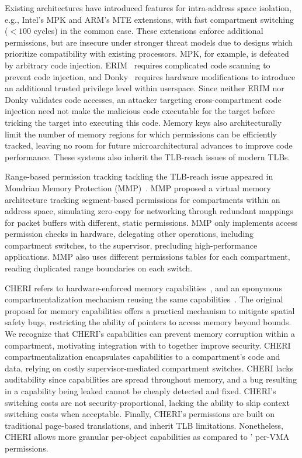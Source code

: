 Existing architectures have introduced features for intra-address
space isolation, e.g., Intel's MPK and ARM's MTE extensions,
with fast compartment switching ($<100$ cycles) in the common case.
These extensions enforce additional permissions, but
are insecure under stronger threat models due to designs which
prioritize compatibility with existing processors.
MPK, for example, is defeated by arbitrary code injection.
ERIM~\cite{ERIMOberwagner19} requires complicated code scanning to
prevent code injection, and Donky~\cite{SchrammelWSS0MG20Donky} requires 
hardware modifications to introduce an additional trusted privilege level 
within userspace.
Since neither ERIM nor Donky validates code accesses, an attacker
targeting cross-compartment code injection need not make the
malicious code executable for the target before tricking the target 
into executing this code.
Memory keys also architecturally limit the number of memory regions for 
which permissions can be efficiently tracked, leaving no room for future 
microarchitectural advances to improve code performance.
These systems also inherit the TLB-reach issues of modern TLBs.

Range-based permission tracking tackling the TLB-reach issue 
appeared in Mondrian Memory Protection (MMP)~\cite{WitchelCA02MMP}.
MMP proposed a virtual memory architecture tracking segment-based 
permissions for compartments within an address space, 
simulating zero-copy for networking through redundant mappings for
packet buffers with different, static permissions.
MMP only implements access permission checks in hardware, 
delegating other operations, including compartment switches, 
to the supervisor, precluding high-performance applications.
MMP also uses different permissions tables for each compartment,
reading duplicated range boundaries on each switch.

CHERI refers to hardware-enforced memory capabilities~\cite{WoodruffWCMADLNNR14}, 
and an eponymous compartmentalization mechanism reusing the same 
capabilities~\cite{WatsonWNMACDDGL15}.
The original proposal for memory capabilities offers a practical
mechanism to mitigate spatial safety bugs,
restricting the ability of pointers to access memory beyond bounds.
We recognize that CHERI's capabilities can prevent memory corruption within
a compartment, motivating integration  with \seccells
to together improve security.
CHERI compartmentalization encapsulates capabilities to a compartment's
code and data, relying on costly supervisor-mediated compartment switches.
CHERI lacks auditability since capabilities are spread throughout
memory, and a bug resulting in a capability being leaked cannot be cheaply
detected and fixed.
CHERI's switching costs are not security-proportional, lacking the
ability to skip context switching costs when acceptable.
Finally, CHERI's permissions are built on traditional page-based translations,
and inherit TLB limitations.
Nonetheless, CHERI allows more granular per-object capabilities as compared
to \seccells' per-VMA permissions.

